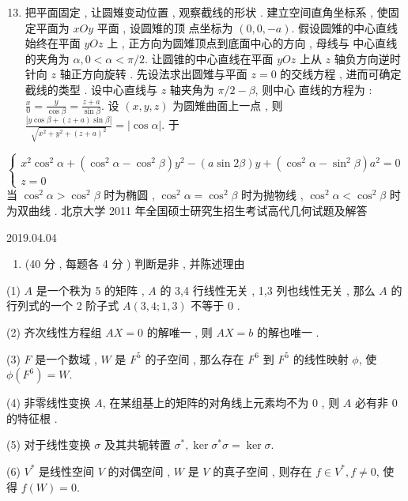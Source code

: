 \documentclass[10pt]{article}
\begin{document}
\begin{enumerate}
  \setcounter{enumi}{12}
  \item  把平面固定 ,  让圆雉变动位置 ,  观察截线的形状 .  建立空间直角坐标系 ,  使固定平面为  $x O y$  平面 ,  设圆雉的顶   点坐标为  $(0,0,-a)$.  假设圆雉的中心直线始终在平面  $y O z$  上 ,  正方向为圆雉顶点到底面中心的方向 ,  母线与   中心直线的夹角为  $\alpha, 0<\alpha<\pi / 2$.  让圆锥的中心直线在平面  $y O z$  上从  $z$  轴负方向逆时针向  $z$  轴正方向旋转 .  先设法求出圆雉与平面  $z=0$  的交线方程 ,  进而可确定截线的类型 .  设中心直线与  $z$  轴夹角为  $\pi / 2-\beta$,  则中心   直线的方程为 : $\frac{x}{0}=\frac{y}{\cos \beta}=\frac{z+a}{\sin \beta}$.  设  $(x, y, z)$  为圆雉曲面上一点 ,  则  $\frac{|y \cos \beta+(z+a) \sin \beta|}{\sqrt{x^{2}+y^{2}+(z+a)^{2}}}=|\cos \alpha|$.  于 
\end{enumerate}
$$
\left\{\begin{array}{r}
x^{2} \cos ^{2} \alpha+\left(\cos ^{2} \alpha-\cos ^{2} \beta\right) y^{2}-(a \sin 2 \beta) y+\left(\cos ^{2} \alpha-\sin ^{2} \beta\right) a^{2}=0 \\
z=0
\end{array}\right.
$$
 当  $\cos ^{2} \alpha>\cos ^{2} \beta$  时为椭圆 , $\cos ^{2} \alpha=\cos ^{2} \beta$  时为抛物线 , $\cos ^{2} \alpha<\cos ^{2} \beta$  时为双曲线 .  北京大学  2011  年全国硕士研究生招生考试高代几何试题及解答     

2019.04.04

\begin{enumerate}
  \item (40  分 ,  每题各  4  分 )  判断是非 ,  并陈述理由 
\end{enumerate}
(1) $A$  是一个秩为  5  的矩阵 , $A$  的  3,4  行线性无关 , 1,3  列也线性无关 ,  那么  $A$  的行列式的一个  2  阶子式  $A(3,4 ; 1,3)$  不等于  0 .

(2)  齐次线性方程组  $A X=0$  的解唯一 ,  则  $A X=b$  的解也唯一 .

(3) $F$  是一个数域 , $W$  是  $F^{5}$  的子空间 ,  那么存在  $F^{6}$  到  $F^{5}$  的线性映射  $\phi$,  使  $\phi\left(F^{6}\right)=W$.

(4)  非零线性变换  $A$,  在某组基上的矩阵的对角线上元素均不为  0 ,  则  $A$  必有非  0  的特征根 .

(5)  对于线性变换  $\sigma$  及其共轭转置  $\sigma^{*}, \operatorname{ker} \sigma^{*} \sigma=\operatorname{ker} \sigma$.

(6) $V^{*}$  是线性空间  $V$  的对偶空间 , $W$  是  $V$  的真子空间 ,  则存在  $f \in V^{*}, f \neq 0$,  使得  $f(W)=0$.
\end{document}
